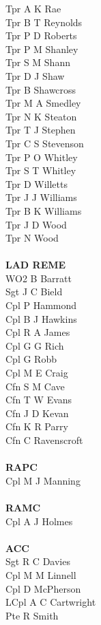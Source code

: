 \begin{multicols}{3}
  Tpr A K Rae \\
  Tpr B T Reynolds \\
  Tpr P D Roberts \\
  Tpr P M Shanley \\
  Tpr S M Shann \\
  Tpr D J Shaw \\
  Tpr B Shawcross \\
  Tpr M A Smedley \\
  Tpr N K Steaton \\
  Tpr T J Stephen \\
  Tpr C S Stevenson \\
  Tpr P O Whitley \\
  Tpr S T Whitley \\
  Tpr D Willetts \\
  Tpr J J Williams \\
  Tpr B K Williams \\
  Tpr J D Wood \\
  Tpr N Wood \\
  \\
  \textbf{LAD REME} \\
  WO2 B Barratt \\
  Sgt J C Bield \\
  Cpl P Hammond \\
  Cpl B J Hawkins \\
  Cpl R A James \\
  Cpl G G Rich \\
  Cpl G Robb \\
  Cpl M E Craig \\
  Cfn S M Cave \\
  Cfn T W Evans \\
  Cfn J D Kevan \\
  Cfn K R Parry \\
  Cfn C Ravenscroft \\
  \\
  \textbf{RAPC} \\
  Cpl M J Manning \\
  \\
  \textbf{RAMC} \\
  Cpl A J Holmes \\
  \\
  \textbf{ACC} \\
  Sgt R C Davies \\
  Cpl M M Linnell \\
  Cpl D McPherson \\
  LCpl A C Cartwright \\
  Pte R Smith \\
\end{multicols}

